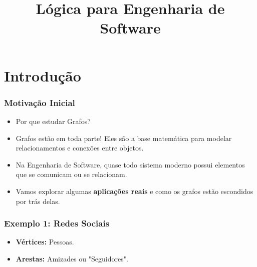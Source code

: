 \documentclass[9pt]{beamer}
\title[Presentation]{Lógica para Engenharia de Software} %
\institute[UniRV]{\textbf{\large  \textcolor{structure}{\textbf{\large
Introdução à Teoria dos Grafos
}}} %
\\ \qquad
\\Professor: Me. Sergio Souza Novak 
\\Faculdade de Engenharia de Software}
\date{}
\begin{document}
\begin{frame}
\titlepage
\end{frame}

\section{Introdução}

\begin{frame}
    \frametitle{Motivação Inicial}
    \begin{itemize}
        \item Por que estudar Grafos?
        \item Grafos estão em toda parte! Eles são a base matemática para modelar relacionamentos e conexões entre objetos.
        \item Na Engenharia de Software, quase todo sistema moderno possui elementos que se comunicam ou se relacionam.
        \item Vamos explorar algumas \textbf{aplicações reais} e como os grafos estão escondidos por trás delas.
    \end{itemize}
\end{frame}

\begin{frame}
    \frametitle{Exemplo 1: Redes Sociais}
    \begin{itemize}
        \item \textbf{Vértices:} Pessoas.
        \item \textbf{Arestas:} Amizades ou "Seguidores".
    \end{itemize}
    \vspace{0.3cm}
    \begin{center}
    \end{center}
\end{frame}
\end{document}
